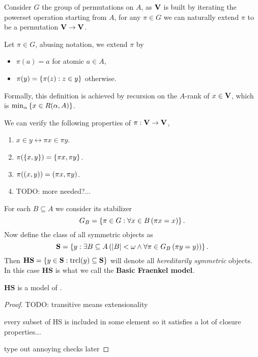 Consider \(G\) the group of permutations on \(A\),
as \(\mathbf{V}\) is built by iterating the powerset operation starting from \(A\),
for any \(\pi\in G\) we can naturally extend \(\pi\) to be a permutation \(\mathbf{V}\to\mathbf{V}\).
\begin{definition}
    Let \(\pi \in G\), abusing notation, we extend \(\pi\) by
    \begin{itemize}
        \item \(\pi(a) = a\) for atomic \(a\in A\),
        \item \(\pi(y) = \left\{ \pi(z): z\in y \right\}\) otherwise.
    \end{itemize}
\end{definition}
\begin{remark}
    Formally, this definition is achieved by recursion on the \(A\)-rank of \(x\in\mathbf{V}\), which is \(\min_{\alpha} \left\{ x\in R(\alpha,A) \right\}\).
\end{remark}
We can verify the following properties of \(\pi:\mathbf{V}\to\mathbf{V}\),
\begin{enumerate}
    \item \(x\in y\leftrightarrow \pi x \in \pi y\).
    \item \(\pi(\left\{ x,y \right\}) = \left\{ \pi x, \pi y \right\}\).
    \item \(\pi(\left(x,y\right)) = \left(\pi x, \pi y\right)\).
    \item TODO: more needed?...
\end{enumerate}

For each \(B\subseteq A\) we consider its stabilizer
\[ G_B = \left\{ \pi\in G: \forall x\in B\left(\pi x = x\right) \right\}.\]
Now define the class of all symmetric objects as
\[ \mathbf{S} = \left\{ y:\exists B\subseteq A\left(\left\lvert B \right\rvert<\omega \land \forall \pi\in G_B\left(\pi y = y\right)\right) \right\}. \]
Then \(\mathbf{HS} = \left\{ y\in \mathbf{S}:\operatorname{trcl}(y)\subseteq \mathbf{S} \right\}\) will denote all \emph{hereditarily symmetric} objects.
In this case \(\mathbf{HS}\) is what we call the \textbf{Basic Fraenkel model}.

\begin{lemma}
    \(\mathbf{HS}\) is a model of \ZFminus.
\end{lemma}
\begin{proof}
    TODO: transitive means extensionality

    every subset of HS is included in some element so it satisfies a lot of closure properties...

    type out annoying checks later
\end{proof}

